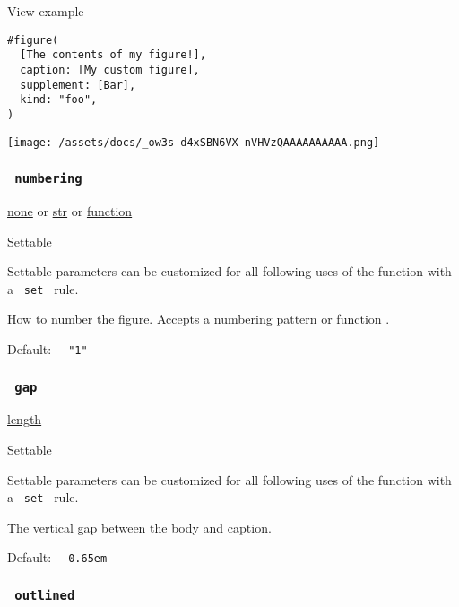 
View example

\begin{verbatim}
#figure(
  [The contents of my figure!],
  caption: [My custom figure],
  supplement: [Bar],
  kind: "foo",
)
\end{verbatim}

\texttt{[image: /assets/docs/\_ow3s-d4xSBN6VX-nVHVzQAAAAAAAAAA.png]}

\subsubsection{\texorpdfstring{\texttt{\ numbering\ }}{ numbering }}\label{parameters-numbering}

\href{/docs/reference/foundations/none/}{none} {or}
\href{/docs/reference/foundations/str/}{str} {or}
\href{/docs/reference/foundations/function/}{function}

{{ Settable }}

\label{parameters-numbering-settable-tooltip}
Settable parameters can be customized for all following uses of the
function with a \texttt{\ set\ } rule.

How to number the figure. Accepts a
\href{/docs/reference/model/numbering/}{numbering pattern or function} .

Default: \texttt{\ }{\texttt{\ "1"\ }}\texttt{\ }

\subsubsection{\texorpdfstring{\texttt{\ gap\ }}{ gap }}\label{parameters-gap}

\href{/docs/reference/layout/length/}{length}

{{ Settable }}

\label{parameters-gap-settable-tooltip}
Settable parameters can be customized for all following uses of the
function with a \texttt{\ set\ } rule.

The vertical gap between the body and caption.

Default: \texttt{\ }{\texttt{\ 0.65em\ }}\texttt{\ }

\subsubsection{\texorpdfstring{\texttt{\ outlined\ }}{ outlined }}\label{parameters-outlined}

